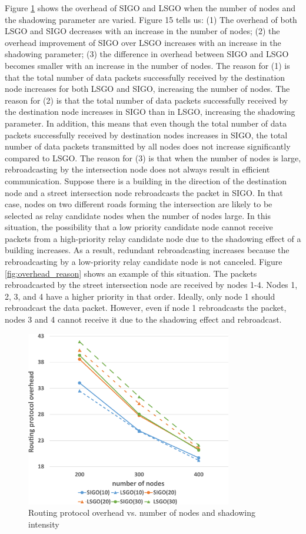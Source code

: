 \documentclass[conference]{IEEEtran}
\begin{document}
Figure \ref{fig:overhead} shows the overhead of SIGO and LSGO when the number of nodes and the shadowing parameter are varied. Figure 15 tells us: (1) The overhead of both LSGO and SIGO decreases with an increase in the number of nodes; (2) the overhead improvement of SIGO over LSGO increases with an increase in the shadowing parameter; (3) the difference in overhead between SIGO and LSGO becomes smaller with an increase in the number of nodes. The reason for (1) is that the total number of data packets successfully received by the destination node increases for both LSGO and SIGO, increasing the number of nodes. The reason for (2) is that the total number of data packets successfully received by the destination node increases in SIGO than in LSGO, increasing the shadowing parameter. In addition, this means that even though the total number of data packets successfully received by destination nodes increases in SIGO, the total number of data packets transmitted by all nodes does not increase signiﬁcantly compared to LSGO. The reason for (3) is that when the number of nodes is large, rebroadcasting by the intersection node does not always result in efficient communication. Suppose there is a building in the direction of the destination node and a street intersection node rebroadcasts the packet in SIGO. In that case, nodes on two different roads forming the intersection are likely to be selected as relay candidate nodes when the number of nodes large. In this situation, the possibility that a low priority candidate node cannot receive packets from a high-priority relay candidate node due to the shadowing effect of a building increases. As a result, redundant rebroadcasting increases because the rebroadcasting by a low-priority relay candidate node is not canceled. Figure \ref{fig:overhead_reason} shows an example of this situation. The packets rebroadcasted by the street intersection node are received by nodes 1-4. Nodes 1, 2, 3, and 4 have a higher priority in that order. Ideally, only node 1 should rebroadcast the data packet. However, even if node 1 rebroadcasts the packet, nodes 3 and 4 cannot receive it due to the shadowing effect and rebroadcast.






\begin{figure}[!ht]
\centering
\includegraphics[width=90mm]{figures/overhead.eps}
\caption{Routing protocol overhead vs. number of nodes and shadowing intensity }
\label{fig:overhead}
\end{figure}
\end{document}
